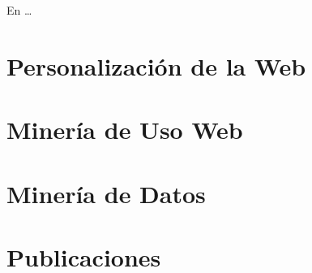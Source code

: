 En \ldots


\section{Personalización de la Web}
\label{sec:srw:personalizacion-de-la-web}





\section{Minería de Uso Web}
\label{sec:srw:muw}






\section{Minería de Datos}
\label{sec:srw:md}






\section{Publicaciones}
\label{sec:srw:publicaciones}





